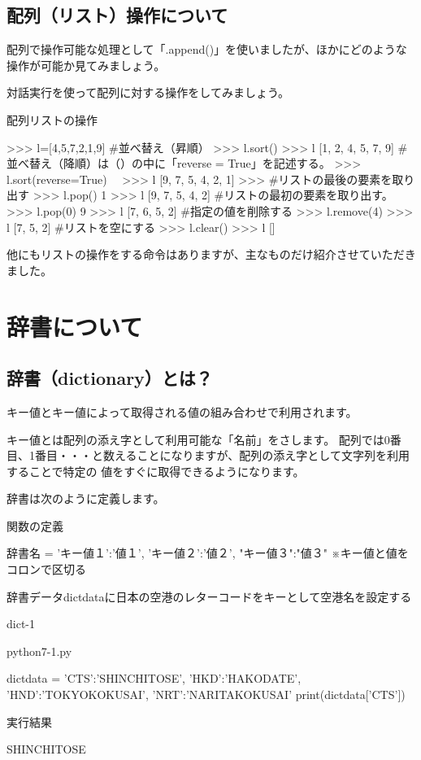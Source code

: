 \documentclass[11pt,a4paper,dvipdfmx,titlepage]{jsreport}
\begin{document}
\subsection{配列（リスト）操作について}
配列で操作可能な処理として「.append()」を使いましたが、ほかにどのような操作が可能か見てみましょう。

 {\gt 対話実行}を使って配列に対する操作をしてみましょう。

\begin{grabox}{配列リストの操作}
\begin{listing}{1}
>>> l=[4,5,7,2,1,9]
#並べ替え（昇順）
>>> l.sort()
>>> l
[1, 2, 4, 5, 7, 9]
#並べ替え（降順）は（）の中に「reverse = True」を記述する。
>>> l.sort(reverse=True)　
>>> l
[9, 7, 5, 4, 2, 1]
>>>
#リストの最後の要素を取り出す
>>> l.pop()
1
>>> l
[9, 7, 5, 4, 2]
#リストの最初の要素を取り出す。
>>> l.pop(0)
9
>>> l
[7, 6, 5, 2]
#指定の値を削除する
>>> l.remove(4)
>>> l
[7, 5, 2]
#リストを空にする
>>> l.clear()
>>> l
[]
\end{listing}
\end{grabox}
他にもリストの操作をする命令はありますが、主なものだけ紹介させていただきました。

\section{辞書について}
\subsection{辞書（dictionary）とは？}

キー値とキー値によって取得される値の組み合わせで利用されます。

キー値とは配列の添え字として利用可能な「名前」をさします。
配列では0番目、1番目・・・と数えることになりますが、配列の添え字として文字列を利用することで特定の
値をすぐに取得できるようになります。

辞書は次のように定義します。
\begin{grabox}{関数の定義}
\begin{listing}{1}
辞書名 = {'キー値１':'値１', 'キー値２':'値２', "キー値３":"値３"}
※キー値と値をコロンで区切る
\end{listing}
\end{grabox}
辞書データdictdataに日本の空港のレターコードをキーとして空港名を設定する
\begin{pabox}{dict-1}
\begin{codebox}{python7-1.py}
\begin{listing}{1}
dictdata = {'CTS':'SHINCHITOSE', 'HKD':'HAKODATE', 
    'HND':'TOKYOKOKUSAI', 'NRT':'NARITAKOKUSAI' }
print(dictdata['CTS'])
   
\end{listing}

実行結果
\begin{listing}{1}
SHINCHITOSE
\end{listing}
\end{codebox}
\end{pabox}
\end{document}

